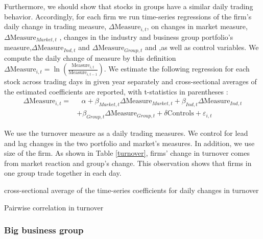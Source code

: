 \documentclass[12pt, a4paper]{article}
\begin{document}
Furthermore, we should show that stocks in groups have a similar daily trading behavior. Accordingly, for each firm we run time-series regressions of the firm's daily change in trading measure, $ \Delta \text{Measure}_{i,t} $, on changes in market measure,$ \Delta\text{Measure}_{Market,t}   $ , changes in the industry and business group portfolio's measure,$ \Delta\text{Measure}_{Ind,t} $ and  $\Delta \text{Measure}_{Group,t} $ and  ,as well as control variables.
We compute the daily change of measure by this definition $ \Delta \text{Measure}_{i,t} = \ln(\frac{\text{Measure}_{i,t}}{\text{Measure}_{i,t-1}}) $. 
We estimate the following regression for each stock across trading days in given year separately and cross-sectional averages of the estimated coefficients are reported, with t-statistics in parentheses :
\begin{equation*}
	\begin{split}
		\Delta \text{Measure}_{i,t} =  & \text{	}\alpha + \beta_{Market,t} \Delta \text{Measure}_{Market,t}  
		+ \beta_{Ind,t} \Delta \text{Measure}_{Ind,t} \\ & + \beta_{Group,t} \Delta \text{Measure}_{Group,t} + \delta\text{Controls} + \varepsilon_{i,t}
	\end{split}
\end{equation*}

We use the turnover measure as a daily trading measures. We control for lead and lag changes in the two portfolio and market's measures. In addition, we use size of the firm. As shown in Table \ref{turnover}, firms' change in turnover comes from market reaction and group's change. This observation shows that firms in one group trade together in each day. 

\begin{table}[htbp]
	\centering
	\caption{cross-sectional average of the time-series coefficients for daily changes in turnover }
	\resizebox{0.7\textheight}{!}{
		
	} \label{turnover}
\end{table}


\begin{table}[htbp]
	\centering
		\caption{Pairwise correlation in turnover  }
	\resizebox{0.7\textheight}{!}{
		\centering
		
	}
\end{table}


\FloatBarrier


 \subsubsection{Big business group}
\end{document}
